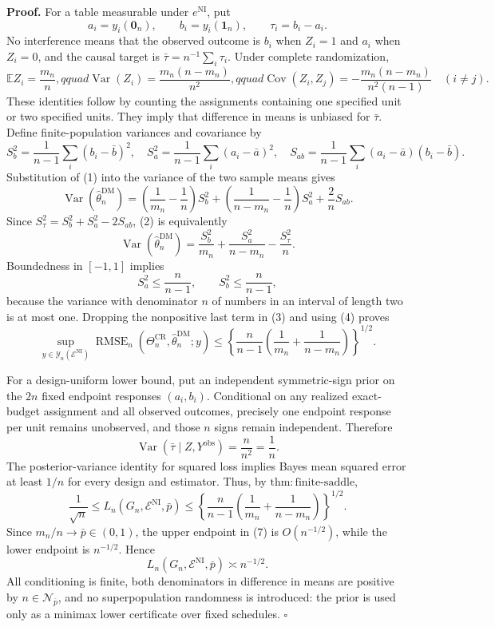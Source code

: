 \textbf{Proof.}
For a table measurable under \(e^{\mathrm{NI}}\), put
\[
 a_i=y_i(\mathbf 0_n),\qquad b_i=y_i(\mathbf 1_n),
 \qquad \tau_i=b_i-a_i.
\]
No interference means that the observed outcome is \(b_i\) when \(Z_i=1\) and \(a_i\) when \(Z_i=0\), and the causal target is \(\bar\tau=n^{-1}\sum_i\tau_i\).  Under complete randomization,
\[
 \mathbb E Z_i=\frac{m_n}{n},qquad
 \operatorname{Var}(Z_i)=\frac{m_n(n-m_n)}{n^2},qquad
 \operatorname{Cov}(Z_i,Z_j)
 =-\frac{m_n(n-m_n)}{n^2(n-1)}\quad(i\ne j). \tag{1}
\]
These identities follow by counting the assignments containing one specified unit or two specified units.  They imply that difference in means is unbiased for \(\bar\tau\).  Define finite-population variances and covariance by
\[
 S_b^2=\frac1{n-1}\sum_i(b_i-\bar b)^2,
 \quad
 S_a^2=\frac1{n-1}\sum_i(a_i-\bar a)^2,
 \quad
 S_{ab}=\frac1{n-1}\sum_i(a_i-\bar a)(b_i-\bar b).
\]
Substitution of (1) into the variance of the two sample means gives
\[
 \operatorname{Var}(\widehat\theta_n^{\mathrm{DM}})
 =\left(\frac1{m_n}-\frac1n\right)S_b^2
  +\left(\frac1{n-m_n}-\frac1n\right)S_a^2
  +\frac{2}{n}S_{ab}. \tag{2}
\]
Since \(S_\tau^2=S_b^2+S_a^2-2S_{ab}\), (2) is equivalently
\[
 \operatorname{Var}(\widehat\theta_n^{\mathrm{DM}})
 =\frac{S_b^2}{m_n}+\frac{S_a^2}{n-m_n}-\frac{S_\tau^2}{n}. \tag{3}
\]
Boundedness in \([-1,1]\) implies
\[
 S_a^2\le\frac{n}{n-1},
 \qquad
 S_b^2\le\frac{n}{n-1}, \tag{4}
\]
because the variance with denominator \(n\) of numbers in an interval of length two is at most one.  Dropping the nonpositive last term in (3) and using (4) proves
\[
 \sup_{y\in\mathcal Y_n(\mathcal E^{\mathrm{NI}})}
 \operatorname{RMSE}_n(\Theta_n^{\mathrm{CR}},
 \widehat\theta_n^{\mathrm{DM}};y)
 \le
 \left\{\frac{n}{n-1}
 \left(\frac1{m_n}+\frac1{n-m_n}\right)\right\}^{1/2}. \tag{5}
\]

For a design-uniform lower bound, put an independent symmetric-sign prior on the \(2n\) fixed endpoint responses \((a_i,b_i)\).  Conditional on any realized exact-budget assignment and all observed outcomes, precisely one endpoint response per unit remains unobserved, and those \(n\) signs remain independent.  Therefore
\[
 \operatorname{Var}(\bar\tau\mid Z,Y^{\mathrm{obs}})
 =\frac{n}{n^2}=\frac1n. \tag{6}
\]
The posterior-variance identity for squared loss implies Bayes mean squared error at least \(1/n\) for every design and estimator.  Thus, by \(\mathrm{thm{:}finite\text{-}saddle}\),
\[
 \frac1{\sqrt n}
 \le L_n(G_n,\mathcal E^{\mathrm{NI}},\bar p)
 \le
 \left\{\frac{n}{n-1}
 \left(\frac1{m_n}+\frac1{n-m_n}\right)\right\}^{1/2}. \tag{7}
\]
Since \(m_n/n\to\bar p\in(0,1)\), the upper endpoint in (7) is \(O(n^{-1/2})\), while the lower endpoint is \(n^{-1/2}\).  Hence
\[
 L_n(G_n,\mathcal E^{\mathrm{NI}},\bar p)\asymp n^{-1/2}.
\]
All conditioning is finite, both denominators in difference in means are positive by \(n\in\mathcal N_{\bar p}\), and no superpopulation randomness is introduced: the prior is used only as a minimax lower certificate over fixed schedules. \(\square\)